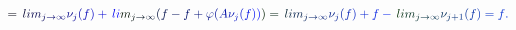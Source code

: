 \documentclass[12pt]{article}
\begin{document}
\makeatletter
\renewcommand*{\@textcolor}[3]{%
  \protect\leavevmode
  \begingroup
    \color#1{#2}#3%
  \endgroup
}
\makeatother
\begin{displaymath}
\mathcolor[RGB]{0,0,15}{=} \mathcolor[RGB]{0,0,30}{\operatorname*} { \mathcolor[RGB]{0,0,45}{l} \mathcolor[RGB]{0,0,60}{i} \mathcolor[RGB]{0,0,75}{m} } _ { \mathcolor[RGB]{0,0,90}{j} \mathcolor[RGB]{0,0,105}{\rightarrow} \mathcolor[RGB]{0,0,120}{\infty} } \mathcolor[RGB]{0,0,135}{\nu} _ { \mathcolor[RGB]{0,0,150}{j} } \mathcolor[RGB]{0,0,165}{(} \mathcolor[RGB]{0,0,180}{f} \mathcolor[RGB]{0,0,195}{)} \mathcolor[RGB]{0,0,210}{+} \mathcolor[RGB]{0,0,225}{\operatorname*} { \mathcolor[RGB]{0,0,240}{l} \mathcolor[RGB]{0,0,255}{i} \mathcolor[RGB]{0,15,0}{m} } _ { \mathcolor[RGB]{0,15,15}{j} \mathcolor[RGB]{0,15,30}{\rightarrow} \mathcolor[RGB]{0,15,45}{\infty} } \mathcolor[RGB]{0,15,60}{(} \mathcolor[RGB]{0,15,75}{f} \mathcolor[RGB]{0,15,90}{-} \mathcolor[RGB]{0,15,105}{f} \mathcolor[RGB]{0,15,120}{+} \mathcolor[RGB]{0,15,135}{\varphi} \mathcolor[RGB]{0,15,150}{(} \mathcolor[RGB]{0,15,165}{A} \mathcolor[RGB]{0,15,180}{\nu} _ { \mathcolor[RGB]{0,15,195}{j} } \mathcolor[RGB]{0,15,210}{(} \mathcolor[RGB]{0,15,225}{f} \mathcolor[RGB]{0,15,240}{)} \mathcolor[RGB]{0,15,255}{)} \mathcolor[RGB]{0,30,0}{)} \mathcolor[RGB]{0,30,15}{=} \mathcolor[RGB]{0,30,30}{\operatorname*} { \mathcolor[RGB]{0,30,45}{l} \mathcolor[RGB]{0,30,60}{i} \mathcolor[RGB]{0,30,75}{m} } _ { \mathcolor[RGB]{0,30,90}{j} \mathcolor[RGB]{0,30,105}{\rightarrow} \mathcolor[RGB]{0,30,120}{\infty} } \mathcolor[RGB]{0,30,135}{\nu} _ { \mathcolor[RGB]{0,30,150}{j} } \mathcolor[RGB]{0,30,165}{(} \mathcolor[RGB]{0,30,180}{f} \mathcolor[RGB]{0,30,195}{)} \mathcolor[RGB]{0,30,210}{+} \mathcolor[RGB]{0,30,225}{f} \mathcolor[RGB]{0,30,240}{-} \mathcolor[RGB]{0,30,255}{\operatorname*} { \mathcolor[RGB]{0,45,0}{l} \mathcolor[RGB]{0,45,15}{i} \mathcolor[RGB]{0,45,30}{m} } _ { \mathcolor[RGB]{0,45,45}{j} \mathcolor[RGB]{0,45,60}{\rightarrow} \mathcolor[RGB]{0,45,75}{\infty} } \mathcolor[RGB]{0,45,90}{\nu} _ { \mathcolor[RGB]{0,45,105}{j} \mathcolor[RGB]{0,45,120}{+} \mathcolor[RGB]{0,45,135}{1} } \mathcolor[RGB]{0,45,150}{(} \mathcolor[RGB]{0,45,165}{f} \mathcolor[RGB]{0,45,180}{)} \mathcolor[RGB]{0,45,195}{=} \mathcolor[RGB]{0,45,210}{f} \mathcolor[RGB]{0,45,225}{.}
\end{displaymath}
\end{document}
